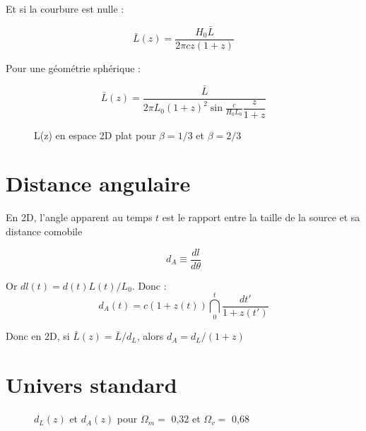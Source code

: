 \documentclass[11pt]{article} %
\begin{document}
Et si la courbure est nulle :

\begin{equation}
\bar{L} (z) = \dfrac{H_0 \bar{L}}{2\pi c z(1+z) }
\end{equation}

Pour une géométrie sphérique :

\begin{equation}
\bar{L} (z) = \dfrac{\bar{L}}{2\pi L_0(1+z)^2 \sin\frac{c}{H_0 L_0} \dfrac{z}{1+z}}
\end{equation}

\begin{figure}[H]
\centering
  \caption{L(z) en espace 2D plat pour $\beta = 1/3$ et $\beta = 2/3$}

\end{figure}

\section{Distance angulaire}

En 2D, l'angle apparent au temps $t$ est le rapport entre la taille de la source et sa distance comobile 

\begin{equation}
d_A \equiv \dfrac{dl}{d\theta}
\end{equation}

Or $dl(t) = d(t) L(t) / L_0$. Donc :
\begin{equation}
d_A(t) = c (1+z(t)) \dint_0^t \dfrac{dt'}{1+z(t')} 
\end{equation}

Donc en 2D, si $\bar{L}(z) = \bar{L}/d_L$, alors $d_A = d_L / (1+z)$

\section{Univers standard}

\begin{figure}[H]
\centering
  \caption{$d_L(z)$ et $d_A(z)$ pour $\Omega_m = $ 0,32 et $\Omega_v = $ 0,68}

\end{figure}
\end{document}
